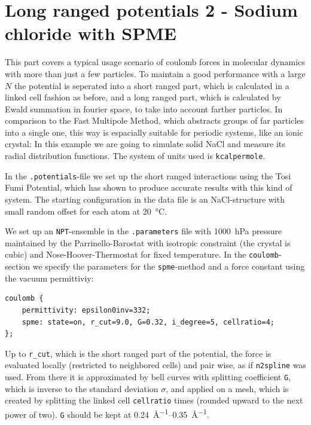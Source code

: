 \section{Long ranged potentials 2 - Sodium chloride with SPME}
This part covers a typical usage scenario of coulomb forces in molecular
dynamics with more than just a few particles. To maintain a good
performance with a large $N$ the potential is seperated into a short
ranged part, which is calculated in a linked cell fashion as before, and
a long ranged part, which is calculated by Ewald summation in fourier
space, to take into account farther particles. In comparison to the Fast
Multipole Method, which abstracts groups of far particles into a single
one, this way is espacially suitable for periodic systems, like an ionic
crystal: In this example we are going to simulate solid NaCl and measure
its radial distribution functions. The system
of units used is \texttt{kcalpermole}.

In the \texttt{.potentials}-file we set up the short ranged interactions
using the Tosi Fumi\cite{tosifuminacl} Potential, which has shown to
produce accurate results with this kind of system. The starting
configuration in the data file is an NaCl-structure with small random
offset for each atom at \SI{20}{\celsius}.

We set up an \texttt{NPT}-ensemble in the \texttt{.parameters} file with
\SI{1000}{\hecto\pascal} pressure maintained by the Parrinello-Barostat with
isotropic constraint (the crystal is cubic) and
Nose-Hoover-Thermostat for fixed temperature. In the
\texttt{coulomb}-section we specify the parameters for the
\texttt{spme}-method and a force constant using the vacuum permittiviy:

\begin{lstlisting}
coulomb {
    permittivity: epsilon0inv=332;
    spme: state=on, r_cut=9.0, G=0.32, i_degree=5, cellratio=4;
};
\end{lstlisting}

Up to \texttt{r\_cut}, which is the short ranged part of the potential,
the force is evaluated locally (restricted to neighbored cells) and pair
wise, as if \texttt{n2spline} was used. From there it is approximated by
bell curves with splitting coefficient
\texttt{G}, which is inverse to the standard deviation $\sigma$, and
applied on a mesh, which is created by splitting the linked cell
\texttt{cellratio} times (rounded upward to the next power of two).
\texttt{G} should be kept at \SIrange{0.24}{0.35}{\angstrom^{-1}}.

